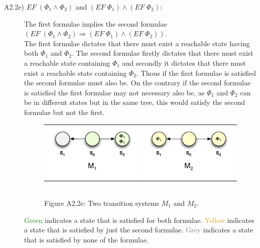 \documentclass[12pt]{report}
\begin{document}
\begin{description}
	\item[A2.2e) $EF \; (\Phi_1 \wedge \Phi_2)$ and $(EF \; \Phi_1) \wedge (EF \;\Phi_2)$:]
		The first formulae implies the second formulae $\left(EF \; (\Phi_1 \wedge \Phi_2) \Rightarrow (EF \; \Phi_1) \wedge (EF \;\Phi_2)\right)$.\\
		The first formulae dictates that there must exist a reachable state having both $\Phi_1$ and $\Phi_2$. The second formulae firstly dictates that there must exist a reachable state containing $\Phi_1$ and secondly it dictates that there must exist a reachable state containing $\Phi_2$. Thous if the first formulae is satisfied the second formulae must also be. On the contrary if the second formulae is satisfied the first formulae may not necessary also be, as $\Phi_1$ and $\Phi_2$ can be in different states but in the same tree, this would satisfy the second formulae but not the first.
		\begin{figure}[H]
			\centering
			\begin{tabular}{ l r }
				\includegraphics[scale=0.75]{../GFX/Answer-A2-2e-1.pdf}
				& \includegraphics[scale=0.75]{../GFX/Answer-A2-2e-2.pdf}
			\end{tabular}\\
			Figure A2.2e: Two transition systems $M_1$ and $M_2$.
		\end{figure}
		\textcolor{ForestGreen}{Green} indicates a state that is satisfied for both formulae. \textcolor{Goldenrod}{Yellow} indicates a state that is satisfied by just the second formulae. \textcolor{Grey}{Grey} indicates a state that is satisfied by none of the formulae.
\end{description}
\end{document}
